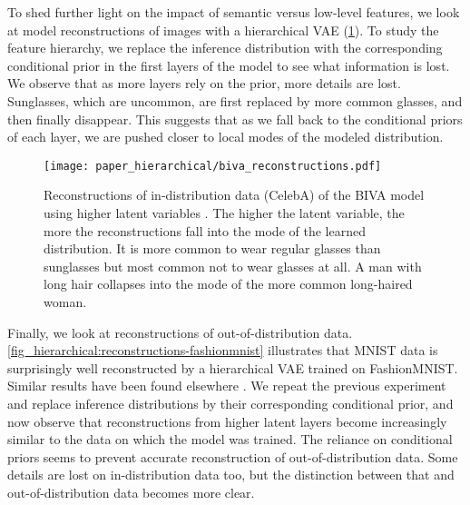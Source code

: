 {To shed further light on the impact of semantic versus low-level features, we look at model reconstructions of images with a hierarchical VAE (\cref{fig_hierarchical:biva-reconstructions-celeba}).
To study the feature hierarchy, we replace the inference distribution with the corresponding conditional prior in the first layers of the model to see what information is lost.
We observe that as more layers rely on the prior, more details are lost.
Sunglasses, which are uncommon, are first replaced by more common glasses, and then finally disappear.
This suggests that as we fall back to the conditional priors of each layer, we are pushed closer to local modes of the modeled distribution.

\begin{figure}[t]
    \centering
    \texttt{[image: paper\_hierarchical/biva\_reconstructions.pdf]}
    \vspace{0mm}
    \caption[Reconstructions of in-distribution data (CelebA) of the BIVA model using higher latent variables.]{Reconstructions of in-distribution data (CelebA) of the BIVA model using higher latent variables  \parencite{maaloe_biva_2019}.
    The higher the latent variable, the more the reconstructions fall into the mode of the learned distribution.
    It is more common to wear regular glasses than sunglasses but most common not to wear glasses at all.
    A man with long hair collapses into the mode of the more common long-haired woman.}
    \vspace{0mm}
    \label{fig_hierarchical:biva-reconstructions-celeba}
\end{figure}
Finally, we look at reconstructions of out-of-distribution data.
\cref{fig_hierarchical:reconstructions-fashionmnist} illustrates that MNIST data is surprisingly well reconstructed by a hierarchical VAE trained on FashionMNIST.
Similar results have been found elsewhere \parencite{xiao_likelihood_2020}.
We repeat the previous experiment and replace inference distributions by their corresponding conditional prior, and now observe that reconstructions from higher latent layers become increasingly similar to the data on which the model was trained.
The reliance on conditional priors seems to prevent accurate reconstruction of out-of-distribution data.
Some details are lost on in-distribution data too, but the distinction between that and out-of-distribution data becomes more clear.

}
